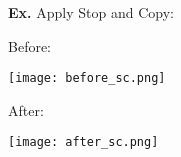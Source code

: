 \hrulefill

\textbf{Ex.} Apply Stop and Copy:
\begin{multicols*}{2}
	Before:

	\texttt{[image: before\_sc.png]}
	\columnbreak

	After:
	\vspace{-11pt}

	\texttt{[image: after\_sc.png]}
\end{multicols*}
